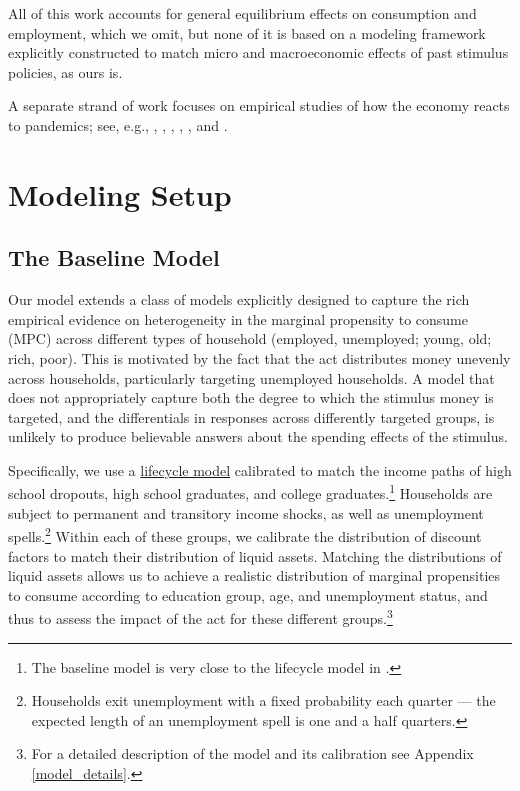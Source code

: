 \documentclass[titlepage,a4paper]{\econtex}
\begin{document}
All of this work accounts for general equilibrium effects on consumption and employment, which we omit, but none of it is based on a modeling framework explicitly constructed to match micro and macroeconomic effects of past stimulus policies, as ours is.

A separate strand of work focuses on empirical studies of how the economy reacts to pandemics; see, e.g., \cite{baker_Cpandemic}, \cite{jorda_pandemics}, \cite{verner_pandemics}, \cite{chetty_covidC}, \cite{garner_receipt}, \cite{casado_stimulus} and \cite{coibion_stimulus}.

\hypertarget{Modeling-Setup}{}

\section{Modeling Setup}

\subsection{The Baseline Model}

Our model extends a class of models explicitly designed to capture the rich empirical evidence on heterogeneity in the marginal propensity to consume (MPC) across different types of household (employed, unemployed; young, old; rich, poor).
This is motivated by the fact that the act distributes money unevenly across households, particularly targeting unemployed households.
A model that does not appropriately capture both the degree to which the stimulus money is targeted, and the differentials in responses across differently targeted groups, is unlikely to produce believable answers about the spending effects of the stimulus.

Specifically, we use a \href{https://pubs.aeaweb.org/doi/pdfplus/10.1257/jep.15.3.3}{lifecycle model} calibrated to match the income paths of high school dropouts, high school graduates, and college graduates.\footnote{The baseline model is very close to the lifecycle model in \cite{cstwMPC}.}
Households are subject to permanent and transitory income shocks, as well as unemployment spells.\footnote{Households exit unemployment with a fixed probability each quarter --- the expected length of an unemployment spell is one and a half quarters.}
Within each of these groups, we calibrate the distribution of discount factors to match their distribution of liquid assets.
Matching the distributions of liquid assets allows us to achieve a realistic distribution of marginal propensities to consume according to education group, age, and unemployment status, and thus to assess the impact of the act for these different groups.\footnote{For a detailed description of the model and its calibration see Appendix \ref{model_details}.}
\end{document}
